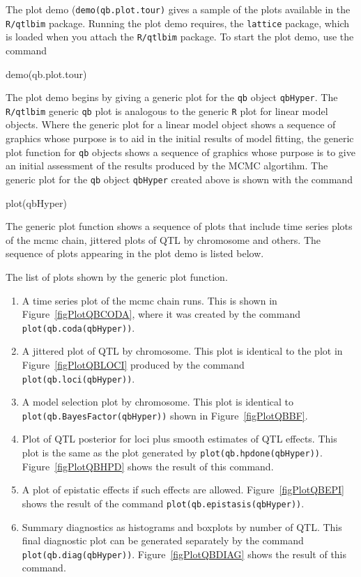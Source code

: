 \documentclass{article}
\begin{document}
The plot demo (\texttt{demo(qb.plot.tour)} gives a sample of the plots
available in the \texttt{R/qtlbim} package.  Running the plot demo
requires, the \texttt{lattice} package, which is loaded when you
attach the \texttt{R/qtlbim} package.
To start the plot demo, use the command 
\begin{Schunk}
\begin{Sinput}
demo(qb.plot.tour)
\end{Sinput}
\end{Schunk}

                   
The plot demo begins by giving a generic plot for the \texttt{qb} object
\texttt{qbHyper}. The \texttt{R/qtlbim} generic \texttt{qb} plot is
analogous to the generic \texttt{R} plot for linear model objects.
Where the generic plot for a linear model object shows a sequence of
graphics whose purpose is to aid in the initial results of model
fitting, the generic plot function for \texttt{qb} objects  shows  a
sequence of graphics whose purpose is to give an initial assessment of
the results produced by the MCMC algortihm. The generic plot for the
\texttt{qb} object \texttt{qbHyper} created above is shown with the 
command
\begin{Schunk}
\begin{Sinput}
plot(qbHyper)
\end{Sinput}
\end{Schunk}

The generic plot function shows a sequence of plots that include time
series plots of the mcmc chain, jittered plots of QTL by chromosome
and others.  The sequence of plots appearing in the plot demo is
listed below.

The list of plots shown by the generic plot function.
\begin{enumerate}
\item A time series plot of the mcmc chain runs.  This is shown in
Figure~\ref{figPlotQBCODA}, where it was
created by the command \texttt{plot(qb.coda(qbHyper))}. 
\item A jittered plot of QTL by chromosome.  This plot is identical to
the plot in Figure~\ref{figPlotQBLOCI} produced by the command
\texttt{plot(qb.loci(qbHyper))}. 
\item A model selection plot by chromosome.  This plot is identical to
\texttt{plot(qb.BayesFactor(qbHyper))} shown in Figure~\ref{figPlotQBBF}.
\item  Plot of QTL posterior for loci plus smooth estimates of QTL
effects.  This plot is the same as the plot generated by
\texttt{plot(qb.hpdone(qbHyper))}. 
Figure~\ref{figPlotQBHPD} shows the result of this command.
\item A plot of epistatic effects if such effects are
allowed. Figure~\ref{figPlotQBEPI} shows the result of the command
\texttt{plot(qb.epistasis(qbHyper))}. 
\item Summary diagnostics as histograms and boxplots by number of QTL.
This final diagnostic plot can be generated separately by the command
\texttt{plot(qb.diag(qbHyper))}. 
Figure~\ref{figPlotQBDIAG} shows the result of this command.
\end{enumerate}
\end{document}
